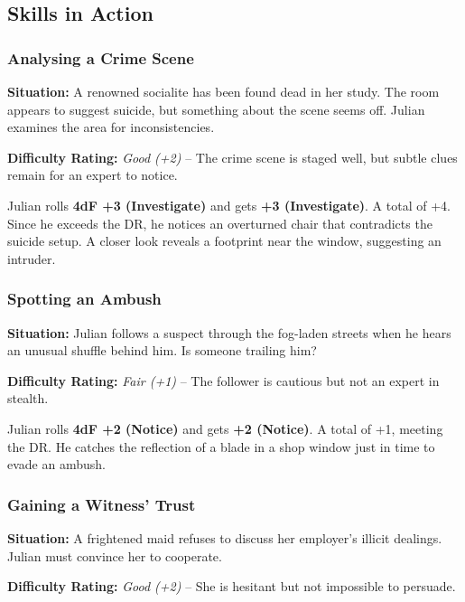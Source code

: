 \subsection{Skills in Action}

\subsubsection{Analysing a Crime Scene}
\textbf{Situation:} A renowned socialite has been found dead in her study. The room appears to suggest suicide, but something about the scene seems off. Julian examines the area for inconsistencies.

\textbf{Difficulty Rating:} \emph{Good (+2)} – The crime scene is staged well, but subtle clues remain for an expert to notice.

\begin{DndReadAloud}{}
Julian rolls \textbf{4dF +3 (Investigate)} and gets
		\textbf{\FudgeRes{+}{+}{-}{} +3 (Investigate)}.		
	A total of +4. Since he exceeds the DR, he notices an overturned chair that contradicts the suicide setup. A closer look reveals a footprint near the window, suggesting an intruder.
\end{DndReadAloud}

\subsubsection{Spotting an Ambush}
\textbf{Situation:} Julian follows a suspect through the fog-laden streets when he hears an unusual shuffle behind him. Is someone trailing him?

\textbf{Difficulty Rating:} \emph{Fair (+1)} – The follower is cautious but not an expert in stealth.

\begin{DndReadAloud}{}
Julian rolls \textbf{4dF +2 (Notice)} and gets 
\textbf{\FudgeRes{+}{-}{-}{} +2 (Notice)}.
A total of +1, meeting the DR. He catches the reflection of a blade in a shop window just in time to evade an ambush.
\end{DndReadAloud}

\subsubsection{Gaining a Witness’ Trust}
\textbf{Situation:} A frightened maid refuses to discuss her employer’s illicit dealings. Julian must convince her to cooperate.

\textbf{Difficulty Rating:} \emph{Good (+2)} – She is hesitant but not impossible to persuade.


